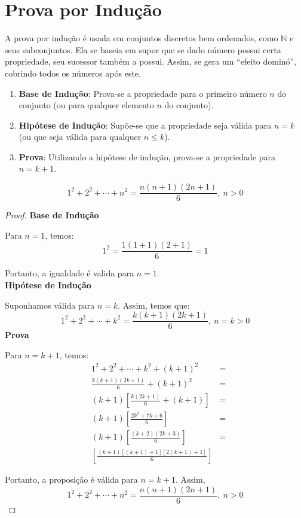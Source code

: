 \section{Prova por Indução}
A prova por indução é usada em conjuntos discretos bem ordenados, como $\mathbb{N}$ e seus subconjuntos. Ela se baseia em supor que se dado número possui certa propriedade, seu sucessor também a possui. Assim, se gera um ``efeito dominó'', cobrindo todos os números após este.
\begin{enumerate}
	\item \textbf{Base de Indução}: Prova-se a propriedade para o primeiro número $n$ do conjunto (ou para qualquer elemento $n$ do conjunto).
	\item \textbf{Hipótese de Indução}: Supõe-se que a propriedade seja válida para $n=k$ (ou que seja válida para qualquer $n\le k$).
	\item \textbf{Prova}: Utilizando a hipótese de indução, prova-se a propriedade para $n=k+1$.
\end{enumerate}
\begin{exemplo}
\[1^2 + 2^2 + \cdots + n^2 = \frac{n(n+1)(2n+1)}{6}, \: n>0 \]
\begin{proof}
\textbf{Base de Indução}\par
Para $n=1$, temos:
\[1^2 = \frac{1(1+1)(2+1)}{6}=1\]\par 
Portanto, a igualdade é valida para $n=1$.\\
\textbf{Hipótese de Indução}\par
Suponhamos válida para $n=k$. Assim, temos que:
\[1^2 + 2^2 + \cdots + k^2 = \frac{k(k+1)(2k+1)}{6}, \: n=k>0\]
\textbf{Prova}\par 
Para $n=k+1$, temos:
\begin{align*}
&1^2 + 2^2 + \cdots + k^2 + (k+1)^2 &= \\
&\frac{k(k+1)(2k+1)}{6} + (k+1)^2 &= \\
&(k+1)\left[ \frac{k(2k+1)}{6} + (k+1)\right] &= \\
&(k+1)\left[ \frac{2k^2+ 7k + 6}{6}\right] &= \\
&(k+1)\left[ \frac{(k+2)(2k+3)}{6}\right] &= \\
&\left[ \frac{(k+1)[(k+1)+1][2(k+1)+1]}{6}\right] &
\end{align*} \par 
Portanto, a proposição é válida para $n=k+1$. Assim, \[1^2 + 2^2 + \cdots + n^2 = \frac{n(n+1)(2n+1)}{6}, \: n>0 \]
\end{proof}
\end{exemplo}

